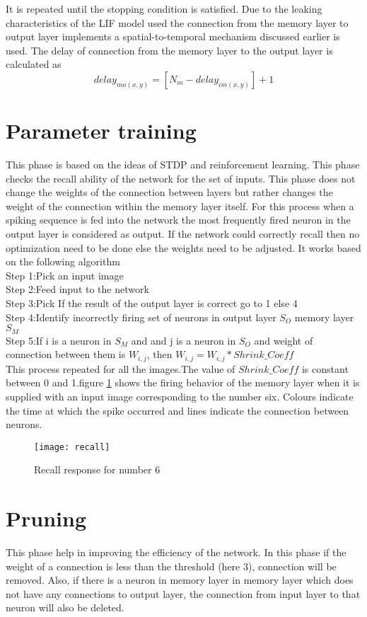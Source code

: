 It is repeated until the stopping condition is satisfied. Due to the leaking
characteristics of the LIF model used the connection from the memory layer to
output layer implements a spatial-to-temporal mechanism discussed earlier is
used. The delay of connection from the memory layer to the output layer is
calculated as
\begin{equation*}
    delay_{mo(x,y)}=[N_m-delay_{im(x,y)}]+1
\end{equation*}
\section{Parameter training}
This phase is based on the ideas of STDP and reinforcement learning. This phase
checks the recall ability of the network for the set of inputs. This phase does
not change the weights of the connection between layers but rather changes the
weight of the connection within the memory layer itself. For this process when
a spiking sequence is fed into the network the most frequently fired neuron in
the output layer is considered as output. If the network could correctly recall
then no optimization need to be done else the weights need to be adjusted. It
works based on the following algorithm \\Step 1:Pick an input image\\ Step
2:Feed input to the network\\ Step 3:Pick If the result of the output layer is
correct go to 1 else 4\\ Step 4:Identify incorrectly firing set of neurons in
output layer $S_{O}$ memory layer $S_{M}$ \\ Step 5:If i is a neuron in $S_M$
and and j is a neuron in $S_O$ and weight of connection between them is
$W_{i,j}$, then $W_{i,j}=W_{i,j}*Shrink\_Coeff$\\ This process repeated for all
the images.The value of $Shrink\_Coeff$ is constant between 0 and 1.figure
\ref{recall} shows the firing behavior of the memory layer when it is supplied
with an input image corresponding to the number six. Colours indicate the time
at which the spike occurred and lines indicate the connection between neurons.
\begin{figure}[h!]
    \centering
    \texttt{[image: recall]}
    \caption{Recall response for number 6}
    \label{recall}
\end{figure}
\section{Pruning}
This phase help in improving the efficiency of the network. In this phase if
the weight of a connection is less than the threshold (here 3), connection will
be removed. Also, if there is a neuron in memory layer in memory layer which
does not have any connections to output layer, the connection from input layer
to that neuron will also be deleted.
